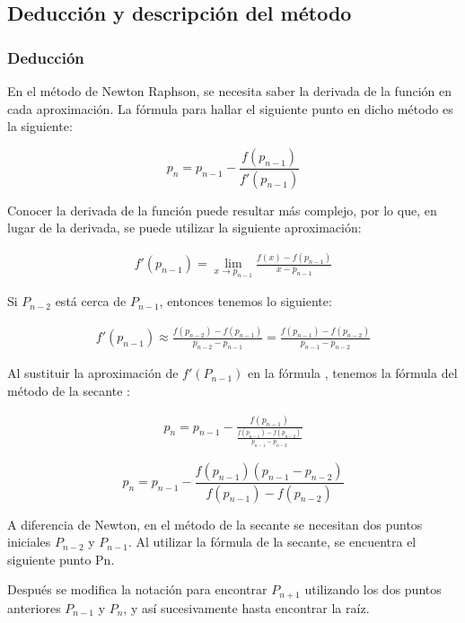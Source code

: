 \subsection{Deducción y descripción del método}
\subsubsection{Deducción}
En el método de Newton Raphson, se necesita saber la derivada de la función en cada aproximación. La fórmula para hallar el siguiente punto en dicho método es la siguiente:

\begin{equation}
\label{secant_eq1}
p_n = p_{n-1} - \frac{f(p_{n-1})}{f'(p_{n-1})}
\end{equation} 

Conocer la derivada de la función puede resultar más complejo, por lo que, en lugar de la derivada, se puede utilizar la siguiente aproximación:

\begin{gather*}
f'(p_{n-1}) = \lim_{x\to p_{n-1}} \frac{f(x) - f(p_{n-1})}{x-p_{n-1}} 
\end{gather*}

Si $P_{n-2}$ está cerca de $P_{n-1}$, entonces tenemos lo siguiente:

\begin{gather*}
f'(p_{n-1}) \approx \frac{f(p_{n-2})-f(p_{n-1})}{p_{n-2}-p_{n-1}} = \frac{f(p_{n-1})-f(p_{n-2})}{p_{n-1}-p_{n-2}}
\end{gather*}

Al sustituir la aproximación de $f'(P_{n-1})$ en la fórmula , tenemos la fórmula del método de la secante \cite{Burden_English}:

\begin{gather*}
p_n = p_{n-1} - \frac{f(p_{n-1})}{\frac{f(p_{n-1})-f(p_{n-2})}{p_{n-1}-p_{n-2}}}
\end{gather*}

\begin{equation}
    \label{secant_eq2}
p_n = p_{n-1} - \frac{f(p_{n-1})(p_{n-1}-p_{n-2})}{f(p_{n-1})-f(p_{n-2})} 
\end{equation}


A diferencia de Newton, en el método de la secante se necesitan dos puntos iniciales $P_{n-2}$ y $P_{n-1}$. Al utilizar la fórmula de la secante, se encuentra el siguiente punto Pn. 

Después se modifica la notación para encontrar $P_{n+1}$ utilizando los dos puntos anteriores $P_{n-1}$ y $P_n$, y así sucesivamente hasta encontrar la raíz.

